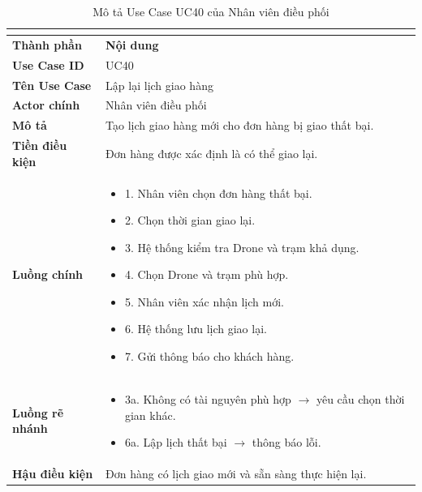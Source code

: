 \begin{longtable}{|C{3cm}|L{11cm}|}
\caption{Mô tả Use Case UC40 của Nhân viên điều phối}\\
\label{tab:mo-ta-uc40-dieu-phoi}\\
\hline
\textbf{Thành phần} & \textbf{Nội dung} \\
\hline
\textbf{Use Case ID} & UC40 \\
\hline
\textbf{Tên Use Case} & Lập lại lịch giao hàng \\
\hline
\textbf{Actor chính} & Nhân viên điều phối \\
\hline
\textbf{Mô tả} &
Tạo lịch giao hàng mới cho đơn hàng bị giao thất bại. \\
\hline
\textbf{Tiền điều kiện} &
Đơn hàng được xác định là có thể giao lại. \\
\hline
\textbf{Luồng chính} &
\begin{itemize}[leftmargin=*,topsep=2pt,itemsep=2pt]
    \item 1. Nhân viên chọn đơn hàng thất bại.
    \item 2. Chọn thời gian giao lại.
    \item 3. Hệ thống kiểm tra Drone và trạm khả dụng.
    \item 4. Chọn Drone và trạm phù hợp.
    \item 5. Nhân viên xác nhận lịch mới.
    \item 6. Hệ thống lưu lịch giao lại.
    \item 7. Gửi thông báo cho khách hàng.
\end{itemize} \\
\hline
\textbf{Luồng rẽ nhánh} &
\begin{itemize}[leftmargin=*,topsep=2pt,itemsep=2pt]
    \item 3a. Không có tài nguyên phù hợp $\rightarrow$ yêu cầu chọn thời gian khác.
    \item 6a. Lập lịch thất bại $\rightarrow$ thông báo lỗi.
\end{itemize} \\
\hline
\textbf{Hậu điều kiện} &
Đơn hàng có lịch giao mới và sẵn sàng thực hiện lại. \\
\hline
\end{longtable}


